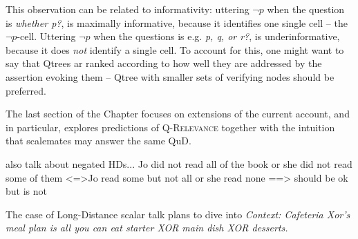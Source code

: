 This observation can be related to informativity: uttering $\neg p$ when the question is \textit{whether p?}, is maximally informative, because it identifies one single cell -- the $\neg p$-cell. Uttering $\neg p$ when the questions is e.g. \textit{p, q, or r?}, is underinformative, because it does \textit{not} identify a single cell. To account for this, one might want to say that Qtrees ar ranked according to how well they are addressed by the assertion evoking them -- Qtree with smaller sets of verifying nodes should be preferred.

The last section of the Chapter focuses on extensions of the current account, and in particular, explores predictions of \textsc{Q-Relevance} together with the intuition that scalemates may answer the same QuD.





\iffalse

\ex.[\Vref{ex7:shd}{$'$}]
\a.{Jo read (only) \textcolor{blue}{some} (but not all) or \textcolor{orange}{all} of the books.}\label{ex7:shdcalar-w-s-repaired}
\b.{Jo read \textcolor{orange}{all} or ${}^\#$(only) \textcolor{blue}{some} ${}^\#$(but not all) of the books.}\label{ex7:hcd-scalar-s-w-repaired}

\ex.[\Vref{ex7:hc-s}{$'$}]
\a.{If Jo read (${}^\#$only) \textcolor{blue}{some} (${}^\#$but not all) of the books she hasn't read \textcolor{orange}{all}.}\label{ex7:hc-scalar-w-ns-repaired}
\b.{If Jo hasn't read \textcolor{orange}{all} of the books she's read (${}^\#$only) \textcolor{blue}{some} (${}^\#$but not all).}\label{ex7:hc-scalar-ns-w-repaired}

\fi





also talk about negated HDs...
Jo did not read all of the book or she did not read some of them
<=>Jo read some but not all or she read none
==> should be ok but is not


The case of Long-Distance scalar  talk plans to dive into
\noindent\textit{Context: Cafeteria Xor's meal plan is all you can eat starter XOR main dish XOR desserts.}
\begin{exe}
\end{exe}

